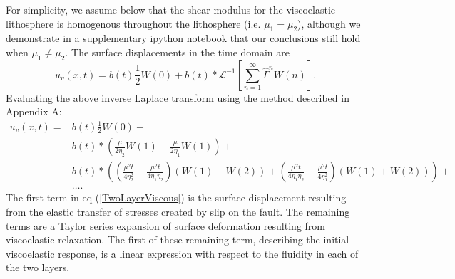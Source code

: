 \documentclass[extra]{gji}
\begin{document}
For simplicity, we assume below that the shear modulus for the
viscoelastic lithosphere is homogenous throughout the lithosphere
(i.e. $\mu_1 = \mu_2$), although we demonstrate in a supplementary
ipython notebook that our conclusions still hold when $\mu_1 \neq
\mu_2$.  The surface displacements in the time domain are
\begin{equation}
 u_v(x,t) = b(t)\frac{1}{2}W(0) + 
            b(t)\ast\mathcal{L}^{-1}\left[\sum_{n=1}^\infty\hat{\Gamma}^{n}W(n)\right].
\end{equation}
Evaluating the above inverse Laplace transform using the method
described in Appendix A:
\begin{align}\label{TwoLayerViscous}
  u_v(x,t) = &b(t)\frac{1}{2}W(0) +\nonumber\\
             &b(t)\ast\left(\frac{\mu}{2\eta_2}W(1) - \frac{\mu}{2\eta_1}W(1)\right) +\nonumber\\
             &b(t)\ast\left(\left(\frac{\mu^2t}{4\eta_2^2} -
                  \frac{\mu^2t}{4\eta_1\eta_2}\right) \left(W(1) - W(2)\right) +
                  \left(\frac{\mu^2t}{4\eta_1\eta_2} - \frac{\mu^2t}{4\eta_1^2}\right)
                  \left(W(1) + W(2)\right)\right) + \nonumber\\ 
             &\dots.
\end{align} 
The first term in eq (\ref{TwoLayerViscous}) is the surface
displacement resulting from the elastic transfer of stresses created
by slip on the fault.  The remaining terms are a Taylor series
expansion of surface deformation resulting from viscoelastic
relaxation.  The first of these remaining term, describing the initial
viscoelastic response, is a linear expression with respect to the
fluidity in each of the two layers.  
\end{document}
